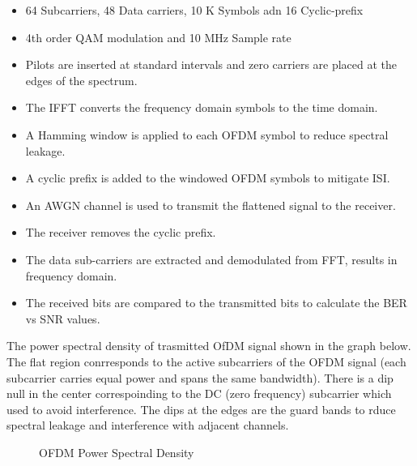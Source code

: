 \documentclass[conference]{IEEEtran}
\begin{document}
\begin{itemize}
\item 64 Subcarriers, 48 Data carriers, 10 K Symbols adn 16 Cyclic-prefix
\item 4th order QAM modulation and 10 MHz Sample rate
\item Pilots are inserted at standard intervals and zero carriers are placed at the edges of the spectrum.
\item The IFFT converts the frequency domain symbols to the time domain. 
\item A Hamming window is applied to each OFDM symbol to reduce spectral leakage. 
\item A cyclic prefix is added to the windowed OFDM symbols to mitigate ISI. 
\item An AWGN channel is used to transmit the flattened signal to the receiver.\par
\item The receiver removes the cyclic prefix. 
\item The data sub-carriers are extracted and demodulated from FFT, results in frequency domain. 
\item The received bits are compared to the transmitted bits to calculate the BER vs SNR values. 
\end{itemize}
The power spectral density of trasmitted OfDM signal shown in the graph below. The flat region conrresponds to the active subcarriers of the OFDM signal (each subcarrier carries equal power and spans the same bandwidth). There is a dip null in the center correspoinding to the DC (zero frequency) subcarrier which used to avoid interference. The dips at the edges are the guard bands to rduce spectral leakage and interference with adjacent channels.

	\begin{figure}[H]
    		\centering
    		\caption{OFDM Power Spectral Density}
	\end{figure}
\end{document}
